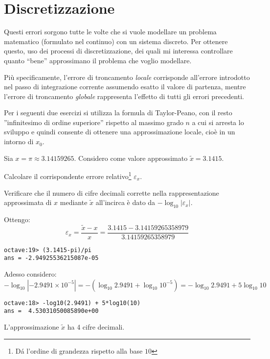 \section{Discretizzazione} 

Questi errori sorgono tutte le volte che si vuole modellare un problema 
matematico (formulato nel continuo) con un sistema discreto. Per ottenere 
questo, uso dei processi di discretizzazione, dei quali mi interessa controllare
quanto ``bene'' approssimano il problema che voglio modellare.

Pi\`u specificamente, l'errore di troncamento \emph{locale} corrisponde 
all'errore introdotto nel passo di integrazione corrente assumendo esatto il 
valore di partenza, mentre l'errore di troncamento \emph{globale} rappresenta 
l'effetto di tutti gli errori precedenti.

Per i seguenti due esercizi si utilizza la formula di Taylor-Peano, con il 
resto ''infinitesimo di ordine superiore'' rispetto al massimo grado $n$ a cui 
si arresta lo sviluppo e quindi consente di ottenere una approssimazione
locale, cio\`e in un intorno di $x_{0}$.

\begin{exercise}[1.1]
	Sia $x = \pi \approx 3.14159265$. Considero come valore approssimato 
	$\tilde{x} = 3.1415$. 
	
	Calcolare il corrispondente errore relativo\footnote{D\'a l'ordine di 
	grandezza rispetto alla base $10$} $\varepsilon_{x}$. 
	
	Verificare che il numero di cifre decimali corrette nella rappresentazione 
	approssimata di $x$ mediante $\tilde{x}$ all'incirca \`e dato da $-\log_{10}
	{|\varepsilon_{x}|}$.
\end{exercise}
Ottengo:
\begin{displaymath}
	\varepsilon_{x} = \frac{\tilde{x}-x}{x} = \frac{3.1415-3.14159265358979}{3.14159265358979}
\end{displaymath}
\begin{lstlisting}
octave:19> (3.1415-pi)/pi
ans = -2.94925536215087e-05
\end{lstlisting}
Adesso considero:
\begin{equation*}
	-\log_{10}{|-2.9491 \times 10^{-5}|} = -\left (\log_{10}{2.9491} +
	\log_{10}{10^{-5}} \right ) = -\log_{10}{2.9491} + 5\log_{10}{10}
\end{equation*}
\begin{lstlisting}
octave:18> -log10(2.9491) + 5*log10(10)
ans =  4.53031050085890e+00
\end{lstlisting}
L'approssimazione $\tilde{x}$ ha 4 cifre decimali.

